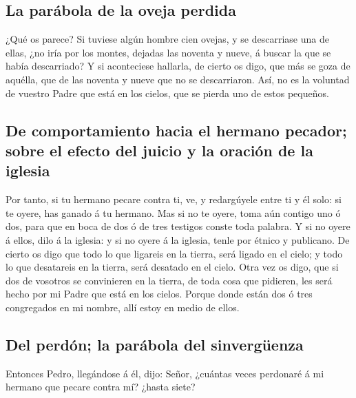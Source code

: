\hypertarget{la-paruxe1bola-de-la-oveja-perdida}{%
\subsection{La parábola de la oveja
perdida}\label{la-paruxe1bola-de-la-oveja-perdida}}

 ¿Qué os parece? Si tuviese algún hombre cien ovejas, y
se descarriase una de ellas, ¿no iría por los montes, dejadas las
noventa y nueve, á buscar la que se había descarriado?  Y
si aconteciese hallarla, de cierto os digo, que más se goza de aquélla,
que de las noventa y nueve que no se descarriaron.  Así,
no es la voluntad de vuestro Padre que está en los cielos, que se pierda
uno de estos pequeños.

\hypertarget{de-comportamiento-hacia-el-hermano-pecador-sobre-el-efecto-del-juicio-y-la-oraciuxf3n-de-la-iglesia}{%
\subsection{De comportamiento hacia el hermano pecador; sobre el efecto
del juicio y la oración de la
iglesia}\label{de-comportamiento-hacia-el-hermano-pecador-sobre-el-efecto-del-juicio-y-la-oraciuxf3n-de-la-iglesia}}

 Por tanto, si tu hermano pecare contra ti, ve, y
redargúyele entre ti y él solo: si te oyere, has ganado á tu hermano.
 Mas si no te oyere, toma aún contigo uno ó dos, para que
en boca de dos ó de tres testigos conste toda palabra.  Y
si no oyere á ellos, dilo á la iglesia: y si no oyere á la iglesia,
tenle por étnico y publicano.  De cierto os digo que todo
lo que ligareis en la tierra, será ligado en el cielo; y todo lo que
desatareis en la tierra, será desatado en el cielo.  Otra
vez os digo, que si dos de vosotros se convinieren en la tierra, de toda
cosa que pidieren, les será hecho por mi Padre que está en los cielos.
 Porque donde están dos ó tres congregados en mi nombre,
allí estoy en medio de ellos.

\hypertarget{del-perduxf3n-la-paruxe1bola-del-sinverguxfcenza}{%
\subsection{Del perdón; la parábola del
sinvergüenza}\label{del-perduxf3n-la-paruxe1bola-del-sinverguxfcenza}}

 Entonces Pedro, llegándose á él, dijo: Señor, ¿cuántas
veces perdonaré á mi hermano que pecare contra mí? ¿hasta siete?

